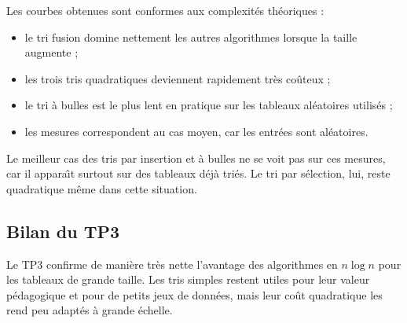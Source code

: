 Les courbes obtenues sont conformes aux complexit\'{e}s th\'{e}oriques :

\begin{itemize}
	\item le tri fusion domine nettement les autres algorithmes lorsque la taille
	      augmente ;
	\item les trois tris quadratiques deviennent rapidement tr\`{e}s co\^{u}teux ;
	\item le tri \`{a} bulles est le plus lent en pratique sur les tableaux
	      al\'{e}atoires utilis\'{e}s ;
	\item les mesures correspondent au cas moyen, car les entr\'{e}es sont
	      al\'{e}atoires.
\end{itemize}

Le meilleur cas des tris par insertion et \`{a} bulles ne se voit pas sur ces
mesures, car il appara\^{\i}t surtout sur des tableaux d\'{e}j\`{a} tri\'{e}s.
Le tri par
s\'{e}lection, lui, reste quadratique m\^{e}me dans cette situation.

\subsection{Bilan du TP3}\label{subsec:tp3-bilan}

Le TP3 confirme de mani\`{e}re tr\`{e}s nette l'avantage des algorithmes en
\(n \log n\) pour les tableaux de grande taille.
Les tris simples restent utiles
pour leur valeur p\'{e}dagogique et pour de petits jeux de donn\'{e}es, mais leur
co\^{u}t quadratique les rend peu adapt\'{e}s \`{a} grande \'{e}chelle.
